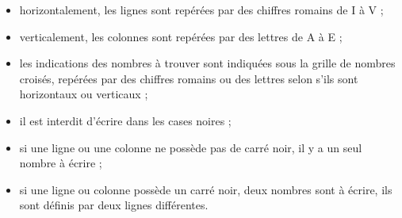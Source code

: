 \phantom{\numeroteEnigme}
\begin{enigme}    
      \begin{itemize}
         \item horizontalement, les lignes sont repérées par des chiffres romains de I à V ;
         \item verticalement, les colonnes sont repérées par des lettres de A à E ;
         \item les indications des nombres à trouver sont indiquées sous la grille de nombres croisés, repérées par des chiffres romains ou des lettres selon s'ils sont horizontaux ou verticaux ;
         \item il est interdit d'écrire dans les cases noires ;
         \item si une ligne ou une colonne ne possède pas de carré noir, il y a un seul nombre à écrire ;
         \item si une ligne ou colonne possède un carré noir, deux nombres sont à écrire, ils sont définis par deux lignes différentes. \\
      \end{itemize}
   

\end{enigme}

